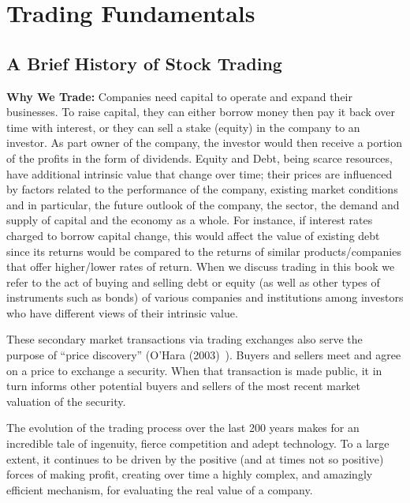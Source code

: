 \chapter{Trading Fundamentals\label{chap:ch_trading_fund}}
\section{A Brief History of Stock Trading}

\noindent\textbf{Why We Trade:} Companies need capital to operate and expand their businesses. To raise capital, they can either borrow money then pay it back over time with interest, or they can sell a stake (equity) in the company to an investor. As part owner of the company, the investor would then receive a portion of the profits in the form of dividends. Equity and Debt, being scarce resources, have additional intrinsic value that change over time; their prices are influenced by factors related to the performance of the company, existing market conditions and in particular, the future outlook of the company, the sector, the demand and supply of capital and the economy as a whole. For instance, if interest rates charged to borrow capital change, this would affect the value of existing debt since its returns would be compared to the returns of similar products/companies that offer higher/lower rates of return. When we discuss trading in this book we refer to the act of buying and selling debt or equity (as well as other types of instruments such as bonds) of various companies and institutions among investors who have different views of their intrinsic value.


These secondary market transactions via trading exchanges also serve the purpose of ``price discovery'' (O'Hara (2003)~\cite{ohara}). Buyers and sellers meet and agree on a price to exchange a security. When that transaction is made public, it in turn informs other potential buyers and sellers of the most recent market valuation of the security.


The evolution of the trading process  over the last 200 years makes for an incredible tale of ingenuity, fierce competition and adept technology. To a large extent, it continues to be driven by the positive (and at times not so positive) forces of making profit, creating over time a highly complex, and amazingly efficient mechanism, for evaluating the real value of a company. \twomedskip


